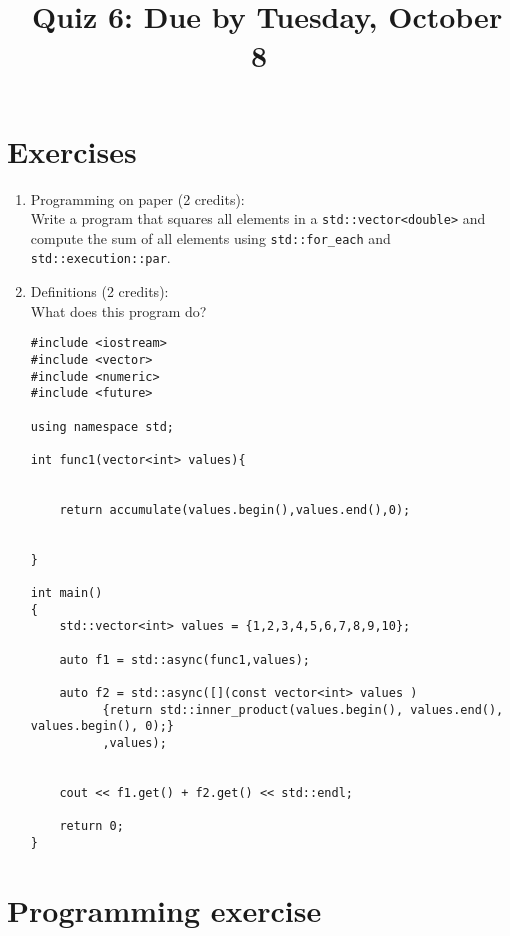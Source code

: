 \documentclass[11pt]{article}
\begin{document}
\title{\coursename~Quiz 6: Due by Tuesday, October 8}
\date{}
\maketitle

\medskip


\section*{Exercises}

\begin{enumerate}
\item Programming on paper (2 credits): \\
Write a program that squares all elements in a \lstinline|std::vector<double>| and compute the sum of all elements using \lstinline|std::for_each| and \lstinline|std::execution::par|.


\item Definitions (2 credits): \\
What does this program do?
\begin{lstlisting}
#include <iostream>
#include <vector>
#include <numeric>
#include <future>

using namespace std;

int func1(vector<int> values){
    
    
    return accumulate(values.begin(),values.end(),0);
    
    
}

int main()
{
    std::vector<int> values = {1,2,3,4,5,6,7,8,9,10};
    
    auto f1 = std::async(func1,values);
    
    auto f2 = std::async([](const vector<int> values )
          {return std::inner_product(values.begin(), values.end(), values.begin(), 0);}
          ,values);
    
    
    cout << f1.get() + f2.get() << std::endl;

    return 0;
}
\end{lstlisting}


\end{enumerate}

\section*{Programming exercise}
\end{document}
